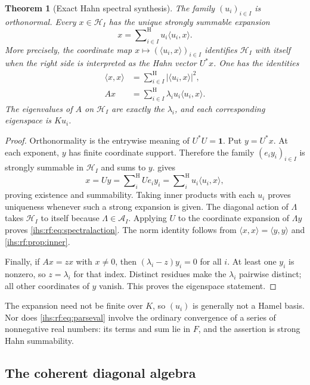 \documentclass[11pt,a4paper]{article}
\numberwithin{equation}{section}
\newtheorem{theorem}{Theorem}[section]
\theoremstyle{definition}
\theoremstyle{remark}
\newcommand{\K}{K}
\newcommand{\Fld}{F}
\newcommand{\Hrf}{\mathcal H_I}
\newcommand{\Arf}{\mathcal A_I}
\newcommand{\Id}{\mathbf 1}
\newcommand{\sH}{\mathop{\sum}\nolimits^{\mathrm H}}
\newcommand{\abs}[1]{\lvert#1\rvert}
\newcommand{\ip}[2]{\langle#1,#2\rangle}
\begin{document}
\begin{theorem}[Exact Hahn spectral synthesis]\label{ihs:rf:thm:synthesis}
The family $(u_i)_{i\in I}$ is orthonormal. Every $x\in\Hrf$ has the unique
strongly summable expansion
\begin{equation}\label{ihs:rf:eq:synthesis}
 x=\sH_{i\in I}u_i\ip{u_i}{x}.
\end{equation}
More precisely, the coordinate map
$x\mapsto(\ip{u_i}{x})_{i\in I}$ identifies $\Hrf$ with itself when the
right side is interpreted as the Hahn vector $U^*x$. One has the identities
\begin{align}
 \ip{x}{x}&=\sH_{i\in I}\abs{\ip{u_i}{x}}^2,\label{ihs:rf:eq:parseval}\\
 Ax&=\sH_{i\in I}\lambda_i u_i\ip{u_i}{x}.\label{ihs:rf:eq:spectralaction}
\end{align}
The eigenvalues of $A$ on $\Hrf$ are exactly the $\lambda_i$, and each
corresponding eigenspace is $\K u_i$.
\end{theorem}
\begin{proof}
Orthonormality is the entrywise meaning of $U^*U=\Id$. Put $y=U^*x$. At each
exponent, $y$ has finite coordinate support. Therefore the family
$(e_i y_i)_{i\in I}$ is strongly summable in $\Hrf$ and sums to $y$.
 gives
\[
 x=Uy=\sH_i Ue_i y_i=\sH_i u_i\ip{u_i}{x},
\]
proving existence and summability. Taking inner products with each $u_i$
proves uniqueness whenever such a strong expansion is given. The diagonal
action of $\Lambda$ takes $\Hrf$ to itself because $\Lambda\in\Arf$.
Applying $U$ to the coordinate expansion of $\Lambda y$ proves
\eqref{ihs:rf:eq:spectralaction}. The norm identity follows from
$\ip{x}{x}=\ip{y}{y}$ and \cref{ihs:rf:prop:inner}.

Finally, if $Ax=zx$ with $x\ne0$, then $(\lambda_i-z)y_i=0$ for all $i$. At
least one $y_i$ is nonzero, so $z=\lambda_i$ for that index. Distinct
residues make the $\lambda_i$ pairwise distinct; all other coordinates of
$y$ vanish. This proves the eigenspace statement.
\end{proof}

The expansion need not be finite over $\K$, so $(u_i)$ is generally not a
Hamel basis. Nor does \eqref{ihs:rf:eq:parseval} involve the ordinary
convergence of a series of nonnegative real numbers: its terms and sum lie
in $\Fld$, and the assertion is strong Hahn summability.

\subsection{The coherent diagonal algebra}\label{ihs:rf:sec:diagalg}
\end{document}
